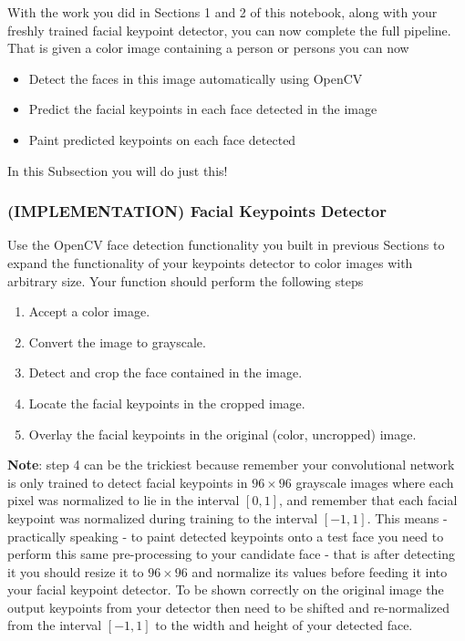 \documentclass[11pt]{article}
\providecommand{\tightlist}{%
      \setlength{\itemsep}{0pt}\setlength{\parskip}{0pt}}
\begin{document}
With the work you did in Sections 1 and 2 of this notebook, along with
your freshly trained facial keypoint detector, you can now complete the
full pipeline. That is given a color image containing a person or
persons you can now

\begin{itemize}
\tightlist
\item
  Detect the faces in this image automatically using OpenCV
\item
  Predict the facial keypoints in each face detected in the image
\item
  Paint predicted keypoints on each face detected
\end{itemize}

In this Subsection you will do just this!

    \subsubsection{(IMPLEMENTATION) Facial Keypoints
Detector}\label{implementation-facial-keypoints-detector}

Use the OpenCV face detection functionality you built in previous
Sections to expand the functionality of your keypoints detector to color
images with arbitrary size. Your function should perform the following
steps

\begin{enumerate}
\def\labelenumi{\arabic{enumi}.}
\tightlist
\item
  Accept a color image.
\item
  Convert the image to grayscale.
\item
  Detect and crop the face contained in the image.
\item
  Locate the facial keypoints in the cropped image.
\item
  Overlay the facial keypoints in the original (color, uncropped) image.
\end{enumerate}

\textbf{Note}: step 4 can be the trickiest because remember your
convolutional network is only trained to detect facial keypoints in
\(96 \times 96\) grayscale images where each pixel was normalized to lie
in the interval \([0,1]\), and remember that each facial keypoint was
normalized during training to the interval \([-1,1]\). This means -
practically speaking - to paint detected keypoints onto a test face you
need to perform this same pre-processing to your candidate face - that
is after detecting it you should resize it to \(96 \times 96\) and
normalize its values before feeding it into your facial keypoint
detector. To be shown correctly on the original image the output
keypoints from your detector then need to be shifted and re-normalized
from the interval \([-1,1]\) to the width and height of your detected
face.
\end{document}
